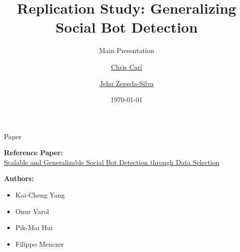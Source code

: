 \documentclass[aspectratio=169, 10pt]{beamer}
\title[Replication Study]{Replication Study: Generalizing Social Bot Detection}
\subtitle{Main Presentation}
\author[Carl \& Zepeda-Silva]{\href{mailto:chris.carl@outlook.com}{Chris Carl} \and \href{mailto:jehu.zepeda-silva@sjsu.edu}{Jehu Zepeda-Silva}}
\institute{San Jose State University}
\date{\today}
\begin{document}
\begin{frame}
  \titlepage
\end{frame}

\begin{frame}{Paper}
  \begin{indentedblock}
    \textbf{Reference Paper:}\\
    \href{https://doi.org/10.1609/aaai.v34i01.5460}{Scalable and Generalizable Social Bot Detection through Data Selection}
  \end{indentedblock}

  \vspace{0.4cm}
  \textbf{Authors:}
  \begin{itemize}
    \item Kai-Cheng Yang
    \item Onur Varol
    \item Pik-Mai Hui
    \item Filippo Menczer
  \end{itemize}
\end{frame}
\end{document}
